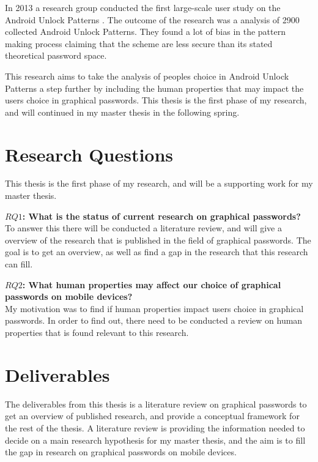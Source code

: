   In 2013 a research group conducted the first large-scale user study on the Android Unlock Patterns \cite{Uellenbeck}. The outcome of the research was a analysis of 2900 collected Android Unlock Patterns. They found a lot of bias in the pattern making process claiming that the scheme are less secure than its stated theoretical password space. 

  This research aims to take the analysis of peoples choice in Android Unlock Patterns a step further by including the human properties that may impact the users choice in graphical passwords. This thesis is the first phase of my research, and will continued in my master thesis in the following spring. 

  \section{Research Questions}
    
    This thesis is the first phase of my research, and will be a supporting work for my master thesis. 

    {\bf $RQ1$: What is the status of current research on graphical passwords?} \\
    To answer this there will be conducted a literature review, and will give a overview of the research that is published in the field of graphical passwords. The goal is to get an overview, as well as find a gap in the research that this research can fill. 

    {\bf $RQ2$: What human properties may affect our choice of graphical passwords on mobile devices?}\\
    My motivation was to find if human properties impact users choice in graphical passwords. In order to find out, there need to be conducted a review on human properties that is found relevant to this research. 

  \section{Deliverables}

    The deliverables from this thesis is a literature review on graphical passwords to get an overview of published research, and provide a conceptual framework for the rest of the thesis. A literature review is providing the information needed to decide on a main research hypothesis for my master thesis, and the aim is to fill the gap in research on graphical passwords on mobile devices.

